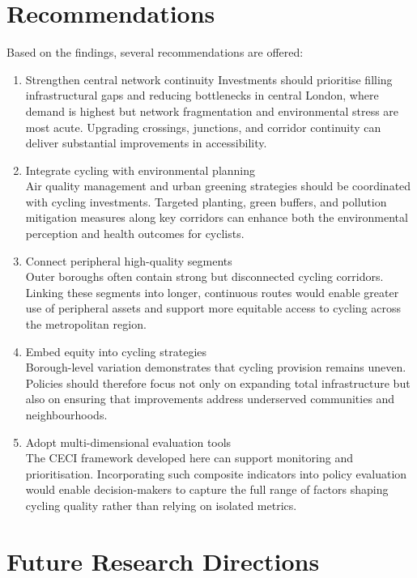 \documentclass[
  12pt,
  oneside]{book}
\begin{document}
\section{Recommendations}\label{recommendations}

Based on the findings, several recommendations are offered:

\begin{enumerate}
\def\labelenumi{\arabic{enumi}.}
\item
  Strengthen central network continuity
  Investments should prioritise filling infrastructural gaps and reducing bottlenecks in central London, where demand is highest but network fragmentation and environmental stress are most acute. Upgrading crossings, junctions, and corridor continuity can deliver substantial improvements in accessibility.
\item
  Integrate cycling with environmental planning\\
  Air quality management and urban greening strategies should be coordinated with cycling investments. Targeted planting, green buffers, and pollution mitigation measures along key corridors can enhance both the environmental perception and health outcomes for cyclists.
\item
  Connect peripheral high-quality segments\\
  Outer boroughs often contain strong but disconnected cycling corridors. Linking these segments into longer, continuous routes would enable greater use of peripheral assets and support more equitable access to cycling across the metropolitan region.
\item
  Embed equity into cycling strategies\\
  Borough-level variation demonstrates that cycling provision remains uneven. Policies should therefore focus not only on expanding total infrastructure but also on ensuring that improvements address underserved communities and neighbourhoods.
\item
  Adopt multi-dimensional evaluation tools\\
  The CECI framework developed here can support monitoring and prioritisation. Incorporating such composite indicators into policy evaluation would enable decision-makers to capture the full range of factors shaping cycling quality rather than relying on isolated metrics.
\end{enumerate}

\section{Future Research Directions}\label{future-research-directions}
\end{document}
